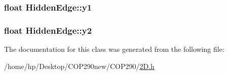 \subsubsection[{\texorpdfstring{y1}{y1}}]{\setlength{\rightskip}{0pt plus 5cm}float Hidden\+Edge\+::y1}\hypertarget{class_hidden_edge_a7e1436e8b31eca0d8b944d81ff9238a1}{}\label{class_hidden_edge_a7e1436e8b31eca0d8b944d81ff9238a1}
\subsubsection[{\texorpdfstring{y2}{y2}}]{\setlength{\rightskip}{0pt plus 5cm}float Hidden\+Edge\+::y2}\hypertarget{class_hidden_edge_a63af4b7204c511284e364a8fede55d46}{}\label{class_hidden_edge_a63af4b7204c511284e364a8fede55d46}


The documentation for this class was generated from the following file\+:\begin{DoxyCompactItemize}
\item 
/home/hp/\+Desktop/\+C\+O\+P290new/\+C\+O\+P290/\hyperlink{2_d_8h}{2\+D.\+h}\end{DoxyCompactItemize}

